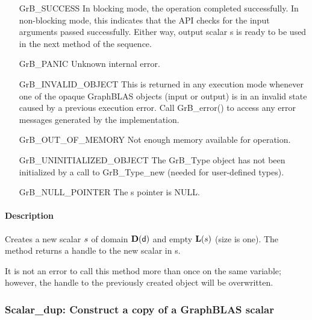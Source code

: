\begin{itemize}[leftmargin=2.1in]
    \item[{\sf GrB\_SUCCESS}]         In blocking mode, the operation completed
    successfully. In non-blocking mode, this indicates that the API checks 
    for the input arguments passed successfully. Either way, output scalar 
    {\sf s} is ready to be used in the next method of the sequence.

    \item[{\sf GrB\_PANIC}]           Unknown internal error.
    
    \item[{\sf GrB\_INVALID\_OBJECT}] This is returned in any execution mode 
    whenever one of the opaque GraphBLAS objects (input or output) is in an invalid 
    state caused by a previous execution error.  Call {\sf GrB\_error()} to access 
    any error messages generated by the implementation.

    \item[{\sf GrB\_OUT\_OF\_MEMORY}] Not enough memory available for operation.
    
    \item[{\sf GrB\_UNINITIALIZED\_OBJECT}]  The {\sf GrB\_Type} object has not 
    been initialized by a call to {\sf GrB\_Type\_new} (needed for user-defined types).
    
    \item[{\sf GrB\_NULL\_POINTER}]  The {\sf s} pointer is {\sf NULL}.
\end{itemize}

\paragraph{Description}

Creates a new scalar ${s}$ of domain $\mathbf{D}({\sf d})$ and empty 
$\mathbf{L}({s})$ (size is one). The method returns a handle to the new scalar in {\sf s}.

It is not an error to call this method more than once on the same variable;  
however, the handle to the previously created object will be overwritten. 

\subsubsection{{\sf Scalar\_dup}: Construct a copy of a GraphBLAS scalar}

